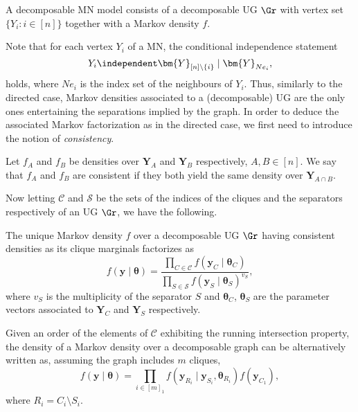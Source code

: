 \begin{definition}
A decomposable \gls{MN} model consists of a decomposable \gls{UG} $\Gr$ with vertex set $\{Y_i:i\in[n]\}$ together with a Markov density $f$. 
\end{definition}
Note that for each vertex $Y_i$ of a \gls{MN}, the conditional independence statement
\begin{equation*}
\label{eq:independenceUG}
Y_i\independent \bm{Y}_{[n]\setminus \{i\}}\;|\; \bm{Y}_{Ne_i},
\end{equation*}
holds, where $Ne_i$ is the index set of the neighbours of $Y_i$. Thus, similarly to the directed case, Markov densities associated to a (decomposable) \gls{UG} are the only ones entertaining the separations implied by the graph. In order to deduce the associated Markov factorization as in the directed case, we first need to introduce the notion of \textit{consistency}.
\begin{definition}
Let $f_A$ and $f_B$ be densities over $\bm{Y}_A$ and $\bm{Y}_B$ respectively, $A,B\in[n]$. We say that $f_A$ and $f_B$ are consistent if they both yield the same density over $\bm{Y}_{A\cap B}$. 
\end{definition}
Now letting $\mathcal{C}$ and $\mathcal{S}$ be the sets of the indices of the cliques and the separators respectively of an \gls{UG} $\Gr$, we have the following.
\begin{lemma}
\label{lemma:Markov}
The unique Markov density $f$ over a decomposable \gls{UG} $\Gr$ having consistent densities as its clique marginals factorizes as
\begin{equation*}
\label{eq:UGmarkovfactorization}
f(\bm{y}\;|\;\bm{\theta})=\frac{\prod_{C\in\mathcal{C}}f(\bm{y}_C\;|\;\bm{\theta}_C)}{\prod_{S\in\mathcal{S}}f(\bm{y}_S\;|\; \bm{\theta}_S)^{v_S}},
\end{equation*}
where $v_S$ is the multiplicity of the separator $S$ and $\bm{\theta}_C$, $\bm{\theta}_S$ are the parameter vectors associated to $\bm{Y}_C$ and $\bm{Y}_S$ respectively.
\end{lemma} 

Given an order of the elements of $\mathcal{C}$ exhibiting the running intersection property, the density of a Markov density over a decomposable graph can be alternatively written as, assuming the graph includes $m$ cliques,
\begin{equation*}
\label{eq:cliquesfactorization}
f(\bm{y}\;|\;\bm{\theta})=\prod_{i\in[m]_1} f(\bm{y}_{R_i}\;|\; \bm{y}_{S_i}, \bm{\theta}_{R_i})f(\bm{y}_{C_1}),
\end{equation*}
where $R_i=C_i\setminus S_i$.

